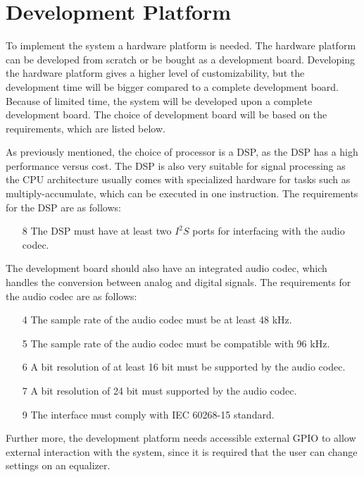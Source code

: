 \chapter{Development Platform}

To implement the system a hardware platform is needed. The hardware platform can be developed from scratch or be bought as a development board. Developing the hardware platform gives a higher level of customizability, but the development time will be bigger compared to a complete development board. Because of limited time, the system will be developed upon a complete development board. The choice of development board will be based on the requirements, which are listed below.

As previously mentioned, the choice of processor is a DSP, as the DSP has a high performance versus cost. The DSP is also very suitable for signal processing as the CPU architecture usually comes with specialized hardware for tasks such as multiply-accumulate, which can be executed in one instruction. The requirements for the DSP are as follows:

\begin{enumerate}
\item[8] The DSP must have at least two $I^2S$ ports for interfacing with the audio codec.
\end{enumerate}

The development board should also have an integrated audio codec, which handles the conversion between analog and digital signals. The requirements for the audio codec are as follows:

\begin{enumerate}
\item[4] The sample rate of the audio codec must be at least 48 kHz.
\item[5] The sample rate of the audio codec must be compatible with 96 kHz.
\item[6] A bit resolution of at least 16 bit must be supported by the audio codec.
\item[7] A bit resolution of 24 bit must supported by the audio codec.
\item[9] The interface must comply with IEC 60268-15 standard.
\end{enumerate}

Further more, the development platform needs accessible external GPIO to allow external interaction with the system, since it is required that the user can change settings on an equalizer. 



